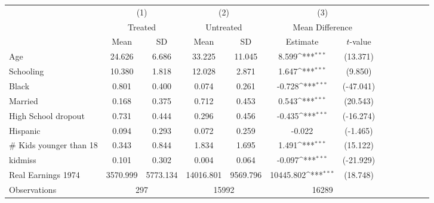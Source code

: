 {
\def\sym#1{\ifmmode^{#1}\else\(^{#1}\)\fi}
\begin{tabular}{l*{3}{cccc}}
\hline\hline
                    &\multicolumn{2}{c}{(1)}  &\multicolumn{2}{c}{(2)}  &\multicolumn{2}{c}{(3)}           \\
                    &\multicolumn{2}{c}{Treated}&\multicolumn{2}{c}{Untreated}&\multicolumn{2}{c}{Mean Difference}\\
                    & Mean & SD & Mean & SD & Estimate & $t$-value \\
\hline
Age   &      24.626&       6.686&      33.225&      11.045&       8.599\sym{***}&    (13.371)\\
Schooling  &      10.380&       1.818&      12.028&       2.871&       1.647\sym{***}&     (9.850)\\
Black &       0.801&       0.400&       0.074&       0.261&      -0.728\sym{***}&   (-47.041)\\
Married &       0.168&       0.375&       0.712&       0.453&       0.543\sym{***}&    (20.543)\\
High School dropout &       0.731&       0.444&       0.296&       0.456&      -0.435\sym{***}&   (-16.274)\\
Hispanic &       0.094&       0.293&       0.072&       0.259&      -0.022         &    (-1.465)\\
\# Kids younger than 18&       0.343&       0.844&       1.834&       1.695&       1.491\sym{***}&    (15.122)\\
kidmiss             &       0.101&       0.302&       0.004&       0.064&      -0.097\sym{***}&   (-21.929)\\
Real Earnings 1974  &    3570.999&    5773.134&   14016.801&    9569.796&   10445.802\sym{***}&    (18.748)\\
\hline
Observations        & \multicolumn{2}{c}{297}&\multicolumn{2}{c}{15992}&\multicolumn{2}{c}{16289} \\
\hline\hline
\end{tabular}
}
